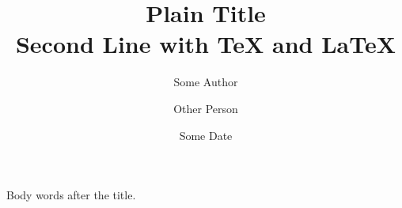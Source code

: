 \documentclass{article}
\title{Plain Title\\ Second Line with \TeX{} and \LaTeX}
\author{Some Author \and Other Person}
\date{Some Date}
\begin{document}
\maketitle
Body words after the title.
\end{document}
